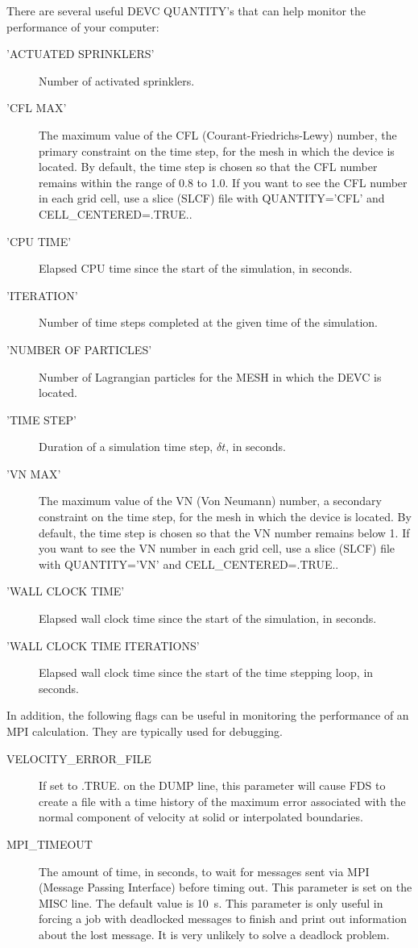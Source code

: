 \documentclass[11pt]{book}
\begin{document}
There are several useful {\ct DEVC} {\ct QUANTITY}'s that can help monitor the performance of your computer:
\begin{description}
\item[{\ct 'ACTUATED SPRINKLERS'}] Number of activated sprinklers.
\item[{\ct 'CFL MAX'}] The maximum value of the CFL (Courant-Friedrichs-Lewy) number, the primary constraint on the time step, for the mesh in which the device is located. By default, the time step is chosen so that the CFL number remains within the range of 0.8 to 1.0. If you want to see the CFL number in each grid cell, use a slice ({\ct SLCF}) file with {\ct QUANTITY='CFL'} and {\ct CELL\_CENTERED=.TRUE.}.
\item[{\ct 'CPU TIME'}] Elapsed CPU time since the start of the simulation, in seconds.
\item[{\ct 'ITERATION'}] Number of time steps completed at the given time of the simulation.
\item[{\ct 'NUMBER OF PARTICLES'}] Number of Lagrangian particles for the {\ct MESH} in which the {\ct DEVC} is located.
\item[{\ct 'TIME STEP'}] Duration of a simulation time step, $\delta t$, in seconds.
\item[{\ct 'VN MAX'}] The maximum value of the VN (Von Neumann) number, a secondary constraint on the time step, for the mesh in which the device is located. By default, the time step is chosen so that the VN number remains below 1. If you want to see the VN number in each grid cell, use a slice ({\ct SLCF}) file with {\ct QUANTITY='VN'} and {\ct CELL\_CENTERED=.TRUE.}.
\item[{\ct 'WALL CLOCK TIME'}] Elapsed wall clock time since the start of the simulation, in seconds.
\item[{\ct 'WALL CLOCK TIME ITERATIONS'}] Elapsed wall clock time since the start of the time stepping loop, in seconds.
\end{description}
In addition, the following flags can be useful in monitoring the performance of an MPI calculation. They are typically used for debugging.
\begin{description}
\item[{\ct VELOCITY\_ERROR\_FILE}] If set to {\ct .TRUE.} on the {\ct DUMP} line, this parameter will cause FDS to create a file with a time history of the maximum error associated with the normal component of velocity at solid or interpolated boundaries.
\item[{\ct MPI\_TIMEOUT}] The amount of time, in seconds, to wait for messages sent via MPI (Message Passing Interface) before timing out. This parameter is set on the {\ct MISC} line. The default value is 10~s. This parameter is only useful in forcing a job with deadlocked messages to finish and print out information about the lost message. It is very unlikely to solve a deadlock problem.
\end{description}
\end{document}
